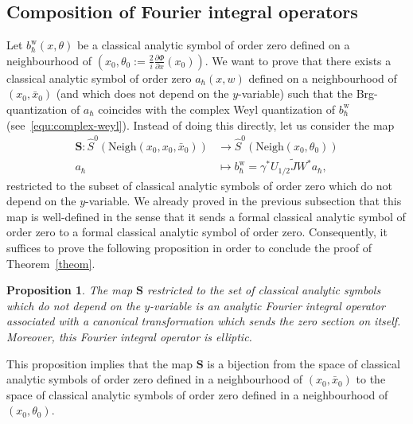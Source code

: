 \documentclass{article}
\newtheorem{prop}[theo]{Proposition}
\newcommand{\Vois}{\mathrm{Neigh}}
\newcommand{\w}{\mathrm{w}}
\begin{document}
\subsection{Composition of Fourier integral operators}
\label{sec:FIO}

Let $b^{\w}_{ \hbar}(x, \theta)$ be a classical analytic symbol of
order zero defined on a neighbourhood of
$ \left( x_0, \theta_0 := \frac{2}{i} \frac{\partial \Phi}{\partial x}
  (x_0) \right)$.
We want to prove that there exists a classical analytic symbol of
order zero $a_{ \hbar}(x, w)$ defined on a neighbourhood of
$(x_0, \bar{x}_0)$ (and which does not depend on the $y$-variable)
such that the Brg-quantization of $a_{ \hbar}$ coincides with the
complex Weyl quantization of $b_{ \hbar}^{\w}$
(see~\eqref{equ:complex-weyl}).  Instead of doing this directly, let
us consider the map
\begin{align}
  \mathbf{S}: \hat S^0(\Vois(x_0, x_0, \bar{x}_0)) 
  & 
    \longrightarrow \hat S^0(\Vois \left(x_0, \theta_0 \right)) \\
  a_{ \hbar} 
  & \longmapsto b^{\w}_{ \hbar} = \gamma^* U_{1/2} \tilde{J} W^* a_{ \hbar},
\end{align}
restricted to the subset of classical analytic symbols of order zero
which do not depend on the $y$-variable.  We already proved in the
previous subsection that this map is well-defined in the sense that it
sends a formal classical analytic symbol of order zero to a formal
classical analytic symbol of order zero. Consequently, it suffices to
prove the following proposition in order to conclude the proof of
Theorem~\ref{theom}.

\begin{prop}
  \label{prop:S}
  The map $\mathbf{S}$ restricted to the set of classical analytic
  symbols which do not depend on the $y$-variable is an analytic
  Fourier integral operator associated with a canonical transformation
  which sends the zero section on itself. Moreover, this Fourier
  integral operator is elliptic.
\end{prop}

This proposition implies that the map $\mathbf{S}$ is a bijection from
the space of classical analytic symbols of order zero defined in a
neighbourhood of $(x_0, \bar{x}_0)$ to the space of classical analytic
symbols of order zero defined in a neighbourhood of
$ \left( x_0, \theta_0\right)$.
\end{document}
